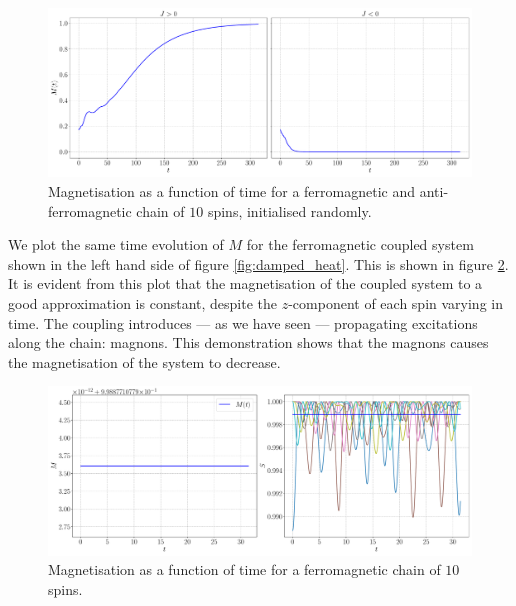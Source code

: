 \begin{figure}[htb]
	\centering
	\includegraphics[width=\columnwidth]{../fig/magnetisation.pdf}
	\caption{Magnetisation as a function of time for a ferromagnetic and anti-ferromagnetic chain of $10$ spins, initialised randomly.}
	\label{fig:magn}
\end{figure}

We plot the same time evolution of $M$ for the ferromagnetic coupled system shown in the left hand side of figure \ref{fig:damped_heat}. This is shown in figure \ref{fig:magn_coupled}. It is evident from this plot that the magnetisation of the coupled system to a good approximation is constant, despite the $z$-component of each spin varying in time. The coupling introduces --- as we have seen --- propagating excitations along the chain: magnons. This demonstration shows that the magnons causes the magnetisation of the system to decrease. 
\begin{figure}[htb]
	\centering
	\includegraphics[width=\columnwidth]{../fig/magnetisation_coupled.pdf}
	\caption{Magnetisation as a function of time for a ferromagnetic chain of $10$ spins.}
	\label{fig:magn_coupled}
\end{figure}
